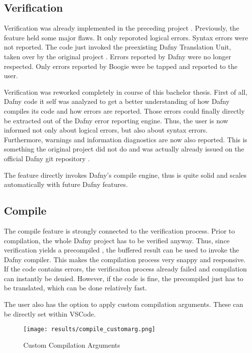\subsection{Verification}
Verification was already implemented in the preceding project \cite{sa}.
Previously, the feature held some major flaws.
It only reporoted logical errors.
Syntax errors were not reported.
The code just invoked the preexisting Dafny Translation Unit, taken over by the original project \cite{ba}.
Errors reported by Dafny were no longer respected.
Only errors reported by Boogie were be tapped and reported to the user.

Verification was reworked completely in course of this bachelor thesis.
First of all, Dafny code it self was analyzed to get a better understanding of how Dafny compiles its code and how errors are reported.
Those errors could finally directly be extracted out of the Dafny error reporting engine.
Thus, the user is now informed not only about logical errors, but also about syntax errors.
Furthermore, warnings and information diagnostics are now also reported.
This is something the original project \cite{ba} did not do and was actually already issued on the official Dafny git repository \cite{dafny_noWarnings}.

The feature directly invokes Dafny's compile engine, thus is quite solid and scales automatically with future Dafny features.



\subsection{Compile}
The compile feature is strongly connected to the verification process.
Prior to compilation, the whole Dafny project has to be verified anyway.
Thus, since verification yields a precompiled , the buffered result can be used to invoke the Dafny compiler.
This makes the compilation process very snappy and responsive.
If the code contains errors, the verificaiton process already failed and compilation can instantly be denied.
However, if the code is fine, the precompiled  just has to be translated, which can be done relatively fast.

The user also has the option to apply custom compilation arguments.
These can be directly set within VSCode.
\begin{figure}[H]
    \centering
    \texttt{[image: results/compile\_customarg.png]}
    \caption{Custom Compilation Arguments}
    \label{fig:compilation_custom_args}
\end{figure}


